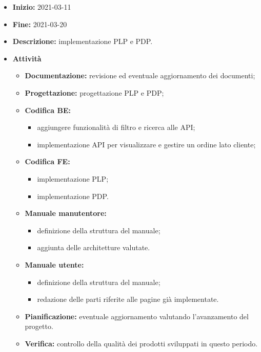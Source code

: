 \begin{itemize}
    \item [] \textbf{Inizio:} 2021-03-11
    \item [] \textbf{Fine:} 2021-03-20
    \item [] \textbf{Descrizione:} implementazione PLP e PDP.
    \item [] \textbf{Attività}
          \begin{itemize}
              \item \textbf{Documentazione:} revisione ed eventuale aggiornamento dei documenti;
              \item \textbf{Progettazione:} progettazione PLP e PDP;
              \item \textbf{Codifica BE:}
                    \begin{itemize}
                        \item aggiungere funzionalità di filtro e ricerca alle API;
                        \item implementazione API per visualizzare e gestire un ordine lato cliente;
                    \end{itemize}
              \item \textbf{Codifica FE:}
                    \begin{itemize}
                        \item implementazione PLP;
                        \item implementazione PDP.
                    \end{itemize}
              \item \textbf{Manuale manutentore:}
                    \begin{itemize}
                        \item definizione della struttura del manuale;
                        \item aggiunta delle architetture valutate.
                    \end{itemize}
              \item \textbf{Manuale utente:}
                    \begin{itemize}
                        \item definizione della struttura del manuale;
                        \item redazione delle parti riferite alle pagine già implementate.
                    \end{itemize}
              \item \textbf{Pianificazione:} eventuale aggiornamento valutando l'avanzamento del progetto.
              \item \textbf{Verifica:} controllo della qualità dei prodotti sviluppati in questo periodo.
          \end{itemize}
\end{itemize}

